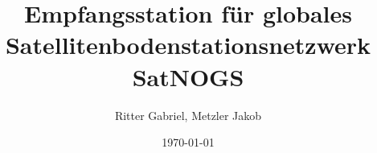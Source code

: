 \documentclass[12pt]{scrreprt}
\title{Empfangsstation für globales Satellitenbodenstationsnetzwerk SatNOGS}
\author{Ritter Gabriel, Metzler Jakob}
\date{\today}
\begin{document}
	
	\maketitle
	
	
	\pagebreak
	
	\tableofcontents
	\pagebreak
	
	
	\pagebreak
	
		
	\pagebreak
	
	
	\pagebreak
	
\end{document}
